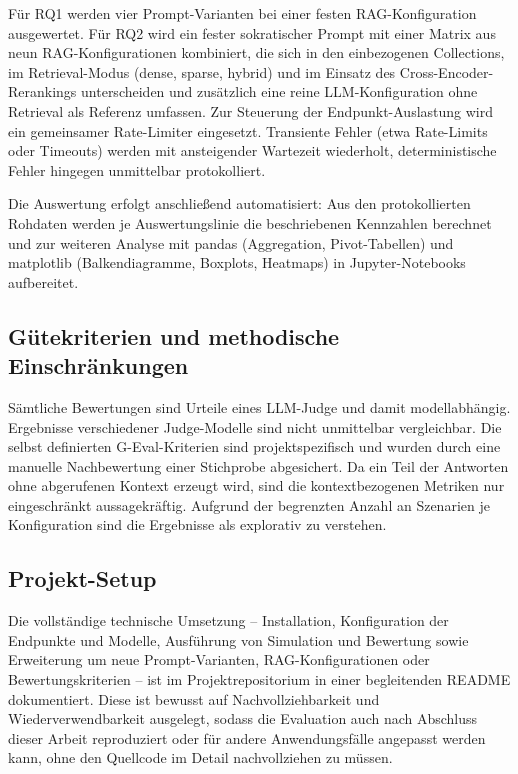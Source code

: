 Für RQ1 werden vier Prompt-Varianten bei einer festen
RAG-Konfiguration ausgewertet. Für RQ2 wird ein fester sokratischer Prompt mit einer
Matrix aus neun RAG-Konfigurationen kombiniert, die sich in den einbezogenen
Collections, im Retrieval-Modus (dense, sparse, hybrid) und im Einsatz des
Cross-Encoder-Rerankings unterscheiden und zusätzlich eine reine LLM-Konfiguration
ohne Retrieval als Referenz umfassen. Zur Steuerung der Endpunkt-Auslastung wird ein
gemeinsamer Rate-Limiter eingesetzt. Transiente Fehler (etwa Rate-Limits oder
Timeouts) werden mit ansteigender Wartezeit wiederholt, deterministische Fehler
hingegen unmittelbar protokolliert.

Die Auswertung erfolgt anschließend automatisiert: Aus den protokollierten Rohdaten
werden je Auswertungslinie die beschriebenen Kennzahlen berechnet und zur weiteren Analyse mit pandas (Aggregation, Pivot-Tabellen) und matplotlib
(Balkendiagramme, Boxplots, Heatmaps) in Jupyter-Notebooks aufbereitet.

\subsection{Gütekriterien und methodische Einschränkungen}
\label{subsec:limitationen}

Sämtliche Bewertungen sind Urteile eines LLM-Judge und damit modellabhängig. Ergebnisse
verschiedener Judge-Modelle sind nicht unmittelbar vergleichbar. Die selbst definierten
G-Eval-Kriterien sind projektspezifisch und wurden durch eine manuelle Nachbewertung einer Stichprobe abgesichert. Da ein
Teil der Antworten ohne abgerufenen Kontext erzeugt wird, sind die kontextbezogenen
Metriken nur eingeschränkt aussagekräftig.
Aufgrund der begrenzten Anzahl an Szenarien je Konfiguration sind die Ergebnisse als
explorativ zu verstehen.
\subsection{Projekt-Setup}
Die vollständige technische Umsetzung -- Installation, Konfiguration der Endpunkte
und Modelle, Ausführung von Simulation und Bewertung sowie Erweiterung um neue
Prompt-Varianten, RAG-Konfigurationen oder Bewertungskriterien -- ist im
Projektrepositorium in einer begleitenden README dokumentiert. Diese ist bewusst auf
Nachvollziehbarkeit und Wiederverwendbarkeit ausgelegt, sodass die Evaluation auch
nach Abschluss dieser Arbeit reproduziert oder für andere Anwendungsfälle angepasst
werden kann, ohne den Quellcode im Detail nachvollziehen zu müssen.